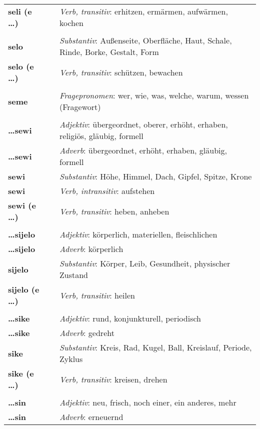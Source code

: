\begin{supertabular}{p{2,5cm}|ll}
\textbf{seli (e \dots)} && \textit{Verb, transitiv}: erhitzen, ermärmen, aufwärmen, kochen \\ 
 && \\ %
\textbf{selo} && \textit{Substantiv}: Außenseite, Oberfläche, Haut, Schale, Rinde, Borke, Gestalt, Form \\ 
\textbf{selo (e \dots)} && \textit{Verb, transitiv}: schützen, bewachen \\ 
 && \\ %
\textbf{seme} && \textit{Fragepronomen}: wer, wie, was, welche, warum, wessen (Fragewort) \\ 
 && \\ %
\textbf{\dots sewi} && \textit{Adjektiv}: übergeordnet, oberer, erhöht, erhaben, religiös, gläubig, formell \\ 
\textbf{\dots sewi} && \textit{Adverb}: übergeordnet, erhöht, erhaben, gläubig, formell \\ 
\textbf{sewi} && \textit{Substantiv}: Höhe, Himmel, Dach, Gipfel, Spitze, Krone \\ 
\textbf{sewi} && \textit{Verb, intransitiv}: aufstehen \\ 
\textbf{sewi (e \dots)} && \textit{Verb, transitiv}: heben, anheben \\ 
 && \\ %
\textbf{\dots sijelo} && \textit{Adjektiv}:  körperlich, materiellen, fleischlichen \\ 
\textbf{\dots sijelo} && \textit{Adverb}: körperlich \\ 
\textbf{sijelo} && \textit{Substantiv}: Körper, Leib, Gesundheit, physischer Zustand \\ 
\textbf{sijelo (e \dots)} && \textit{Verb, transitiv}: heilen \\ 
 && \\ %
\textbf{\dots sike} && \textit{Adjektiv}:  rund, konjunkturell, periodisch \\ 
\textbf{\dots sike} && \textit{Adverb}: gedreht \\ 
\textbf{sike} && \textit{Substantiv}: Kreis, Rad, Kugel, Ball, Kreislauf, Periode, Zyklus \\ 
\textbf{sike (e \dots)} && \textit{Verb, transitiv}: kreisen, drehen \\ 
 && \\ %
\textbf{\dots sin} && \textit{Adjektiv}: neu, frisch, noch einer, ein anderes, mehr \\ 
\textbf{ \dots sin } && \textit{Adverb}: erneuernd \\ 

\end{supertabular}
